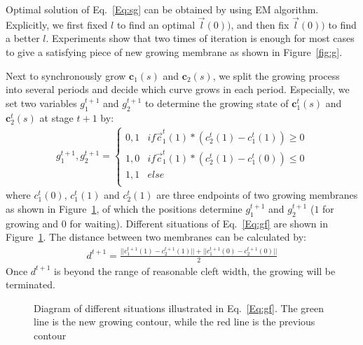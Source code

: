 Optimal solution of Eq.~\ref{Eq:sg} can be obtained by using EM algorithm.
Explicitly, we first fixed $l$ to find an optimal $\overrightarrow{l}(0))$, and then fix $\overrightarrow{l}(0))$ to find a better $l$.
Experiments show that two times of iteration is enough for most cases to give a satisfying piece of new growing membrane as shown in Figure~\ref{fig:g}.

Next to synchronously grow $\mathbf{c}_1(s)$ and $\mathbf{c}_2(s)$, we split the growing process into several periods and decide which curve grows in each period.
Especially, we set two variables $g_1^{t+1}$ and $g_2^{t+1}$ to determine the growing state of $\mathbf{c}_1^{t}(s)$ and $\mathbf{c}_2^{t}(s)$ at stage $t+1$ by:
\begin{eqnarray}\label{Eq:gf}
g_1^{t+1},g_2^{t+1} = \left\{\begin{array}{cc}
0,1&if \overrightarrow{c}^t_1(1)*(c_2^t(1)-c_1^t(1))\geq 0 \\
1,0&if \overrightarrow{c}^t_1(1)*(c_2^t(1)-c_1^t(0))\leq 0\\
1,1& else\\
\end{array}\right.
\end{eqnarray}
where $c_1^t(0)$, $c_1^t(1)$ and $c_2^t(1)$ are three endpoints of two growing membranes as shown in Figure~\ref{fig:sg}, of which the positions determine $g_1^{t+1}$ and $g_2^{t+1}$ ($1$ for growing and $0$ for waiting).
Different situations of Eq.~\ref{Eq:gf} are shown in Figure~\ref{fig:sg}.
The distance between two membranes can be calculated by:
\begin{eqnarray}\label{Eq:d}
d^{t+1} = \frac{||c_1^{t+1}(1)-c_2^{t+1}(1)||+ ||c_1^{t+1}(0)-c_2^{t+1}(0)||}{2}
\end{eqnarray}
Once $d^{t+1}$ is beyond the range of reasonable cleft width, the growing will be terminated.
\begin{figure}[t]
\begin{minipage}[b]{1.0\linewidth}
  \centering
 \centerline{}
\end{minipage}
\caption{Diagram of different situations illustrated in Eq.~\ref{Eq:gf}.
        The green line is the new growing contour, while the red line is the previous contour}
\label{fig:sg}
\end{figure}